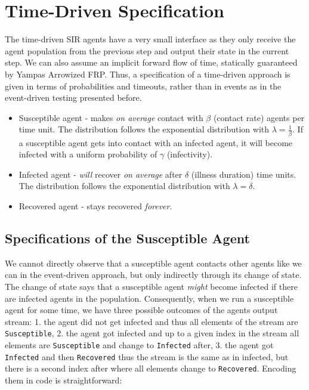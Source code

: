 \section{Time-Driven Specification}
\label{sec:timedriven_specification}
The time-driven SIR agents have a very small interface as they only receive the agent population from the previous step and output their state in the current step. We can also assume an implicit forward flow of time, statically guaranteed by Yampas Arrowized FRP. Thus, a specification of a time-driven approach is given in terms of probabilities and timeouts, rather than in events as in the event-driven testing presented before.

\begin{itemize}
	\item Susceptible agent - makes \textit{on average} contact with $\beta$ (contact rate) agents per time unit. The distribution follows the exponential distribution with $\lambda = \frac{1}{\beta}$. If a susceptible agent gets into contact with an infected agent, it will become infected with a uniform probability of $\gamma$ (infectivity).
	
	\item Infected agent - \textit{will} recover \textit{on average} after $\delta$ (illness duration) time units. The distribution follows the exponential distribution with $\lambda = \delta$.

	\item Recovered agent - stays recovered \textit{forever}.
\end{itemize}

\subsection{Specifications of the Susceptible Agent}
We cannot directly observe that a susceptible agent contacts other agents like we can in the event-driven approach, but only indirectly through its change of state. The change of state says that a susceptible agent \textit{might} become infected if there are infected agents in the population.
Consequently, when we run a susceptible agent for some time, we have three possible outcomes of the agents output stream: 1. the agent did not get infected and thus all elements of the stream are \texttt{Susceptible}, 2. the agent got infected and up to a given index in the stream all elements are \texttt{Susceptible} and change to \texttt{Infected} after, 3. the agent got \texttt{Infected} and then \texttt{Recovered} thus the stream is the same as in infected, but there is a second index after where all elements change to \texttt{Recovered}. Encoding them in code is straightforward:

